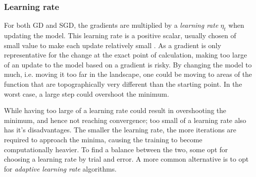 
\subsubsection{Learning rate}
For both GD and SGD, the gradients are multiplied by a \textit{learning rate} $\eta_t$ when updating the model.
This learning rate is a positive scalar, usually chosen of small value to make each update relatively small \citep[p. 84]{Goodfellow-et-al-2016}.
As a gradient is only representative for the change at the exact point of calculation, making too large of an update to the model based on a gradient is risky. By changing the model to much, i.e. moving it too far in the landscape, one could be moving to areas of the function that are topographically very different than the starting point. In the worst case, a large step could overshoot the minimum.

While having too large of a learning rate could result in overshooting the minimum, and hence not reaching convergence; too small of a learning rate also has it's disadvantages. 
The smaller the learning rate, the more iterations are required to approach the minima, causing the training to become computationally heavier. To find a balance between the two, some opt for choosing a learning rate by trial and error.
A more common alternative is to opt for \textit{adaptive learning rate} algorithms.

